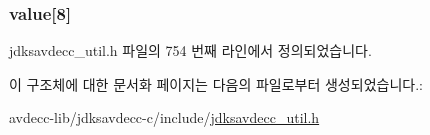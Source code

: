 \subsubsection[{\texorpdfstring{value}{value}}]{ value\mbox{[}8\mbox{]}}\hypertarget{structjdksavdecc__eui64_ac7a8beb4da4fc8eb8acfec13711a134f}{}\label{structjdksavdecc__eui64_ac7a8beb4da4fc8eb8acfec13711a134f}


jdksavdecc\+\_\+util.\+h 파일의 754 번째 라인에서 정의되었습니다.



이 구조체에 대한 문서화 페이지는 다음의 파일로부터 생성되었습니다.\+:\begin{DoxyCompactItemize}
\item 
avdecc-\/lib/jdksavdecc-\/c/include/\hyperlink{jdksavdecc__util_8h}{jdksavdecc\+\_\+util.\+h}\end{DoxyCompactItemize}
